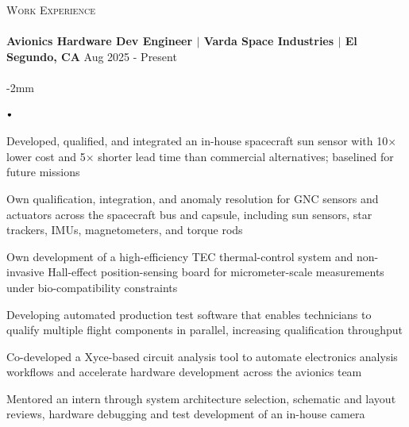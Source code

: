 \documentclass[11pt]{article}
\newcommand{\lineunder}{\vspace*{-8pt} \\ \hspace*{-18pt} \hrulefill \\}
\newcommand{\header}[1]{{\hspace*{-15pt}\vspace*{6pt} \textsc{#1}} \vspace*{-6pt} \lineunder}
\newcommand{\lbt}{\,\begin{picture}(-1,1)(-1,-3)\circle*{3}\end{picture}\ }
\newenvironment{achievements}{
    \begin{list}{$\lbt$}{
        \topsep -1pt
        \itemsep -1pt
        \addtolength{\leftmargin}{-0.15in}
    }
}
{
    \vspace*{0pt}
    \end{list}
}
\newcommand{\schoolwithcourses}[4]{
 \textbf{#1} \hfill{#2}\\
    #3\\
\vspace*{5pt}
}
\begin{document}
\header{Work Experience}

\schoolwithcourses{Avionics Hardware Dev Engineer $\vert$ Varda Space Industries $\vert$ El Segundo, CA}{Aug 2025 - Present}{}

\vspace{-2mm}
\begin{achievements}

\item Developed, qualified, and integrated an in-house spacecraft sun sensor with 10× lower cost and 5× shorter lead time than commercial alternatives; baselined for future missions
\item Own qualification, integration, and anomaly resolution for GNC sensors and actuators across the spacecraft bus and capsule, including sun sensors, star trackers, IMUs, magnetometers, and torque rods
\item Own development of a high-efficiency TEC thermal-control system and non-invasive Hall-effect position-sensing board for micrometer-scale measurements under bio-compatibility constraints
\item Developing automated production test software that enables technicians to qualify multiple flight components in parallel, increasing qualification throughput
\item Co-developed a Xyce-based circuit analysis tool to automate electronics analysis workflows and accelerate hardware development across the avionics team
\item Mentored an intern through system architecture selection, schematic and layout reviews, hardware debugging and test development of an in-house camera

\end{achievements}

\end{document}

